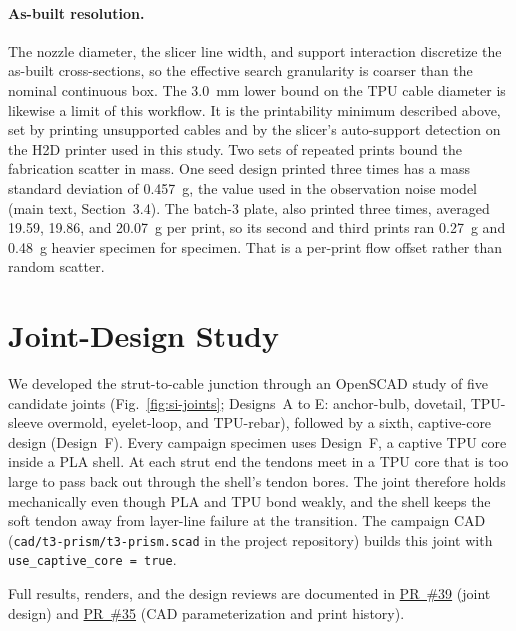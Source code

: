 \documentclass[11pt]{article}
\newcommand{\repo}{https://github.com/vertical-cloud-lab/tensegrity-optimization}
\begin{document}
\paragraph{As-built resolution.} The nozzle diameter, the slicer line width,
and support interaction discretize the as-built cross-sections, so the
effective search granularity is coarser than the nominal continuous box.
The \SI{3.0}{mm}
lower bound on the TPU cable diameter is likewise a limit of this
workflow. It is the printability minimum described above, set by
printing unsupported cables and by the slicer's auto-support
detection on the H2D printer used in this study. Two sets of repeated prints bound the
fabrication scatter in mass. One seed design printed three times has a
mass standard deviation of \SI{0.457}{g}, the value used in the
observation noise model (main text, Section~3.4). The batch-3
plate, also printed three times, averaged 19.59, 19.86, and
\SI{20.07}{g} per print, so its second and third prints ran
\SI{0.27}{g} and \SI{0.48}{g} heavier specimen for specimen. That is a
per-print flow offset rather than random scatter.

\section{Joint-Design Study}
\label{si:joints}
We developed the strut-to-cable junction through an OpenSCAD study of five
candidate joints (Fig.~\ref{fig:si-joints}; Designs~A to E: anchor-bulb, dovetail, TPU-sleeve overmold,
eyelet-loop, and TPU-rebar), followed by a sixth, captive-core design
(Design~F). Every campaign specimen uses Design~F, a captive TPU core inside
a PLA shell. At each strut end the tendons meet in a TPU core that is too
large to pass back out through the shell's tendon bores. The joint therefore
holds mechanically even though PLA and TPU bond weakly, and the shell keeps
the soft tendon away from layer-line failure at the transition. The campaign CAD
(\texttt{cad/t3-prism/t3-prism.scad} in the project repository) builds this
joint with \texttt{use\_captive\_core = true}.

Full results, renders, and the design reviews are documented in
\href{\repo/pull/39}{PR~\#39} (joint design) and
\href{\repo/pull/35}{PR~\#35} (CAD parameterization and print history).
\end{document}
